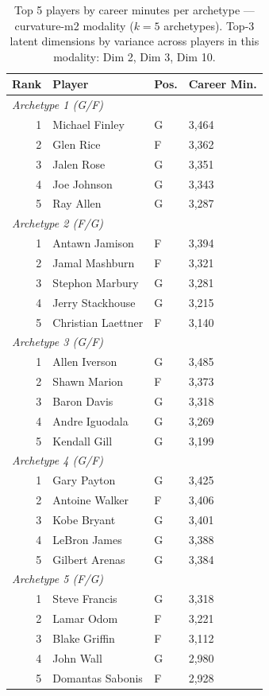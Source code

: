 \begin{table}[htbp]
  \centering\small
  \begin{tabular}{rlll}
    \toprule
    Rank & Player & Pos. & Career Min. \\
    \midrule
    \multicolumn{4}{l}{\textit{Archetype 1 (G/F)}} \\
    \midrule
    1 & Michael Finley & G & 3,464 \\
    2 & Glen Rice & F & 3,362 \\
    3 & Jalen Rose & G & 3,351 \\
    4 & Joe Johnson & G & 3,343 \\
    5 & Ray Allen & G & 3,287 \\
    \midrule[0.4pt]
    \multicolumn{4}{l}{\textit{Archetype 2 (F/G)}} \\
    \midrule
    1 & Antawn Jamison & F & 3,394 \\
    2 & Jamal Mashburn & F & 3,321 \\
    3 & Stephon Marbury & G & 3,281 \\
    4 & Jerry Stackhouse & G & 3,215 \\
    5 & Christian Laettner & F & 3,140 \\
    \midrule[0.4pt]
    \multicolumn{4}{l}{\textit{Archetype 3 (G/F)}} \\
    \midrule
    1 & Allen Iverson & G & 3,485 \\
    2 & Shawn Marion & F & 3,373 \\
    3 & Baron Davis & G & 3,318 \\
    4 & Andre Iguodala & G & 3,269 \\
    5 & Kendall Gill & G & 3,199 \\
    \midrule[0.4pt]
    \multicolumn{4}{l}{\textit{Archetype 4 (G/F)}} \\
    \midrule
    1 & Gary Payton & G & 3,425 \\
    2 & Antoine Walker & F & 3,406 \\
    3 & Kobe Bryant & G & 3,401 \\
    4 & LeBron James & G & 3,388 \\
    5 & Gilbert Arenas & G & 3,384 \\
    \midrule[0.4pt]
    \multicolumn{4}{l}{\textit{Archetype 5 (F/G)}} \\
    \midrule
    1 & Steve Francis & G & 3,318 \\
    2 & Lamar Odom & F & 3,221 \\
    3 & Blake Griffin & F & 3,112 \\
    4 & John Wall & G & 2,980 \\
    5 & Domantas Sabonis & F & 2,928 \\
    \bottomrule
  \end{tabular}
  \caption{Top 5 players by career minutes per archetype --- curvature-m2 modality ($k=5$ archetypes). Top-3 latent dimensions by variance across players in this modality: Dim 2, Dim 3, Dim 10.}
  \label{tab:arch_reps_curvature_m2}
\end{table}

